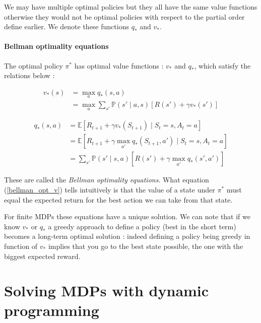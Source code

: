 \documentclass[14pt,a4paper]{article}
\theoremstyle{definition}
\begin{document}
We may have multiple optimal policies but they all have the same value functions otherwise they would not be optimal policies with respect to the partial order define earlier. We denote these functions $q_{*}$ and $v_{*}$.

\paragraph{Bellman optimality equations}

The optimal policy $\pi^*$ has  optimal value functions : $v_* $ and $ q_*$, which satisfy the relations below : 

\begin{equation}
\begin{split}
v_{*}(s)&=\max_{a}q_{*}(s,a)
\\&=\max_{a} \sum_{s'}\mathbb{P}(s'\mid a,s)\left[R(s')+\gamma v_{*}(s')\right]
\end{split}
\label{bellman_opt_v}
\end{equation}

\begin{equation}
\begin{split}
q_{*}(s,a)&=\mathbb{E}\left[ R_{t+1} + \gamma v_{*}(S_ {t+1}) \mid S_t = s, A_t = a \right]
\\&=\mathbb{E}\left[ R_{t+1} + \gamma \max_{a'} q_{*}(S_{t+1},a') \mid S_t = s, A_t = a \right]
\\&= \sum_{s'}\mathbb{P}(s' \mid s,a)[R(s')+\gamma \max_{a'}q_{*}(s',a')]
\end{split}
\label{bellman_opt_q}
\end{equation}

These are called the \emph{Bellman optimality equations}. What equation (\ref{bellman_opt_v}) tells intuitively is that the value of a state under $\pi^*$ must equal the expected return for the best action we can take from that state.


For finite MDPs these equations have a unique solution. We can note that if we know $v_{*}$ or $q_{*}$ a greedy approach to define a policy (best in the short term) becomes a long-term optimal solution : indeed defining a policy being greedy in function of $v_*$ implies that you go to the best state possible, the one with the biggest expected reward.


\section{Solving MDPs with dynamic programming}
\end{document}

